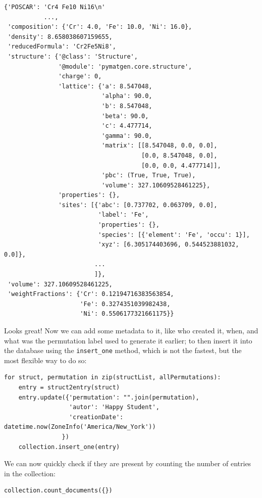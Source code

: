 \begin{verbatim}
{'POSCAR': 'Cr4 Fe10 Ni16\n'
           ...,
 'composition': {'Cr': 4.0, 'Fe': 10.0, 'Ni': 16.0},
 'density': 8.658038607159655,
 'reducedFormula': 'Cr2Fe5Ni8',
 'structure': {'@class': 'Structure',
               '@module': 'pymatgen.core.structure',
               'charge': 0,
               'lattice': {'a': 8.547048,
                           'alpha': 90.0,
                           'b': 8.547048,
                           'beta': 90.0,
                           'c': 4.477714,
                           'gamma': 90.0,
                           'matrix': [[8.547048, 0.0, 0.0],
                                      [0.0, 8.547048, 0.0],
                                      [0.0, 0.0, 4.477714]],
                           'pbc': (True, True, True),
                           'volume': 327.10609528461225},
               'properties': {},
               'sites': [{'abc': [0.737702, 0.063709, 0.0],
                          'label': 'Fe',
                          'properties': {},
                          'species': [{'element': 'Fe', 'occu': 1}],
                          'xyz': [6.305174403696, 0.544523881032, 0.0]},
                         ...
                         ]},
 'volume': 327.10609528461225,
 'weightFractions': {'Cr': 0.12194716383563854,
                     'Fe': 0.3274351039982438,
                     'Ni': 0.5506177321661175}}
\end{verbatim}

Looks great! Now we can add some metadata to it, like who created it,
when, and what was the permutation label used to generate it earlier; to
then insert it into the database using the
\texttt{insert\_one} method, which is not the fastest,
but the most flexible way to do so:

\begin{verbatim}
for struct, permutation in zip(structList, allPermutations):
    entry = struct2entry(struct)
    entry.update({'permutation': "".join(permutation),
                  'autor': 'Happy Student',
                  'creationDate': datetime.now(ZoneInfo('America/New_York'))
                })
    collection.insert_one(entry)
\end{verbatim}

We can now quickly check if they are present by counting the number of
entries in the collection:

\begin{verbatim}
collection.count_documents({})
\end{verbatim}

